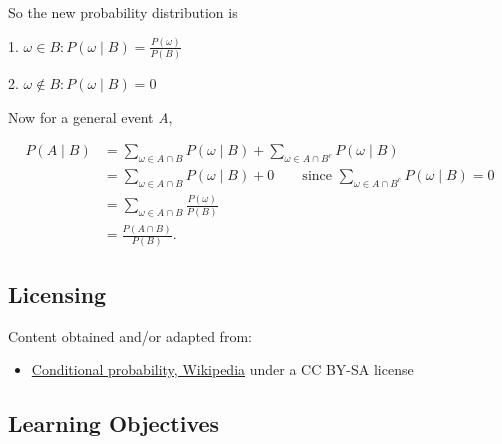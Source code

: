 So the new probability distribution is



1.  $\omega \in B: P(\omega\mid B) = \frac{P(\omega)}{P(B)}$

2.  $\omega \not \in B: P(\omega\mid B) = 0$



Now for a general event \textit{A},



\[
\begin{aligned}
P(A \mid B)
&= \sum_{\omega \in A \cap B} P(\omega \mid B)
   + \sum_{\omega \in A \cap B^{c}} P(\omega \mid B) \\
&= \sum_{\omega \in A \cap B} P(\omega \mid B)
   + 0
   \qquad \text{since } \sum_{\omega \in A \cap B^{c}} P(\omega \mid B)=0 \\
&= \sum_{\omega \in A \cap B} \frac{P(\omega)}{P(B)} \\
&= \frac{P(A \cap B)}{P(B)}.
\end{aligned}
\]


\subsection{Licensing}
\label{sss:lice-7352}
Content obtained and/or adapted from:
\begin{itemize}
    \item \href{https://en.wikipedia.org/wiki/Conditional_probability}{Conditional probability, Wikipedia} under a CC BY-SA license
\end{itemize}


\subsection{Learning Objectives}
\label{ssec:lear-fe6e}


